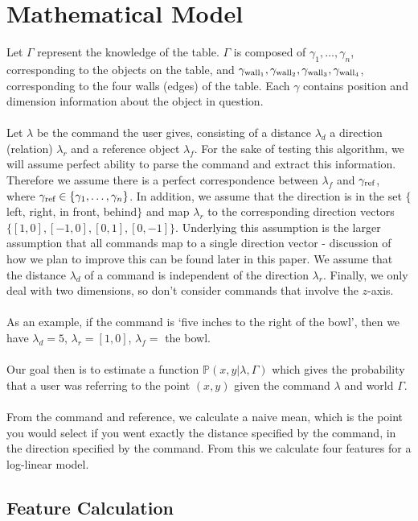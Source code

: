 \documentclass[12pt,letterpaper]{article}
\newcommand\refobj{\textmd{ref}}
\begin{document}
\section{Mathematical Model}
Let $\Gamma$ represent the knowledge of the table. $\Gamma$ is composed of $\gamma_1, \ldots, \gamma_n$, corresponding to the objects on the table, and $\gamma_{\textmd{wall}_1}, \gamma_{\textmd{wall}_2}, \gamma_{\textmd{wall}_3}, \gamma_{\textmd{wall}_4}$, corresponding to the four walls (edges) of the table. Each $\gamma$ contains position and dimension information about the object in question.   \\
\\
Let $\lambda$ be the command the user gives, consisting of a distance $\lambda_d$ a direction (relation) $\lambda_r$ and a reference object $\lambda_f$. For the sake of testing this algorithm, we will assume perfect ability to parse the command and extract this information. Therefore we assume there is a perfect correspondence between $\lambda_f$ and $\gamma_\refobj$, where $\gamma_\refobj \in \{\gamma_1, \ldots, \gamma_n\}$. In addition, we assume that the direction is in the set $\{$left, right, in front, behind$\}$ and map $\lambda_r$ to the corresponding direction vectors $\{[1, 0], [-1, 0], [0, 1], [0, -1]\}$.  Underlying this assumption is the larger assumption that all commands map to a single direction vector - discussion of how we plan to improve this can be found later in this paper. We assume that the distance $\lambda_d$ of a command is independent of the direction $\lambda_r$. Finally, we only deal with two dimensions, so don't consider commands that involve the $z$-axis. \\
\\
As an example, if the command is `five inches to the right of the bowl', then we have $\lambda_d = 5$, $\lambda_r = [1, 0]$, $\lambda_f = $ the bowl. \\
\\
Our goal then is to estimate a function $\mathbb{P}(x, y | \lambda, \Gamma)$ which gives the probability that a user was referring to the point $(x, y)$ given the command $\lambda$ and world $\Gamma$. \\
\\
From the command and reference, we calculate a naive mean, which is the point you would select if you went exactly the distance specified by the command, in the direction specified by the command. From this we calculate four features for a log-linear model. 

\subsection*{Feature Calculation}
\end{document}
